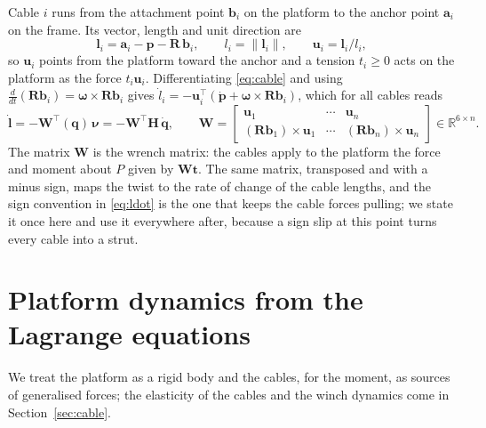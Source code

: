 \documentclass[10pt]{article}
\newcommand{\vc}[1]{\bm{#1}}
\newcommand{\mt}[1]{\mathbf{#1}}
\begin{document}
Cable $i$ runs from the attachment point $\vc b_i$ on the platform to the anchor point $\vc a_i$ on the frame. Its vector, length and unit direction are
\begin{equation}\label{eq:cable}
\vc l_i=\vc a_i-\vc p-\mt R\,\vc b_i,\qquad l_i=\lVert\vc l_i\rVert,\qquad \vc u_i=\vc l_i/l_i ,
\end{equation}
so $\vc u_i$ points from the platform toward the anchor and a tension $t_i\ge 0$ acts on the platform as the force $t_i\vc u_i$. Differentiating \eqref{eq:cable} and using $\tfrac{d}{dt}(\mt R\vc b_i)=\vc\omega\times\mt R\vc b_i$ gives $\dot l_i=-\vc u_i^\top(\dot{\vc p}+\vc\omega\times\mt R\vc b_i)$, which for all cables reads
\begin{equation}\label{eq:ldot}
\dot{\vc l}=-\mt W^\top(\vc q)\,\vc\nu=-\mt W^\top\mt H\,\dot{\vc q},\qquad
\mt W=\begin{bmatrix}\vc u_1&\cdots&\vc u_n\\ (\mt R\vc b_1)\times\vc u_1&\cdots&(\mt R\vc b_n)\times\vc u_n\end{bmatrix}\in\mathbb{R}^{6\times n}.
\end{equation}
The matrix $\mt W$ is the wrench matrix: the cables apply to the platform the force and moment about $P$ given by $\mt W\vc t$. The same matrix, transposed and with a minus sign, maps the twist to the rate of change of the cable lengths, and the sign convention in \eqref{eq:ldot} is the one that keeps the cable forces pulling; we state it once here and use it everywhere after, because a sign slip at this point turns every cable into a strut.

\section{Platform dynamics from the Lagrange equations}\label{sec:lagrange}

We treat the platform as a rigid body and the cables, for the moment, as sources of generalised forces; the elasticity of the cables and the winch dynamics come in Section~\ref{sec:cable}.
\end{document}
